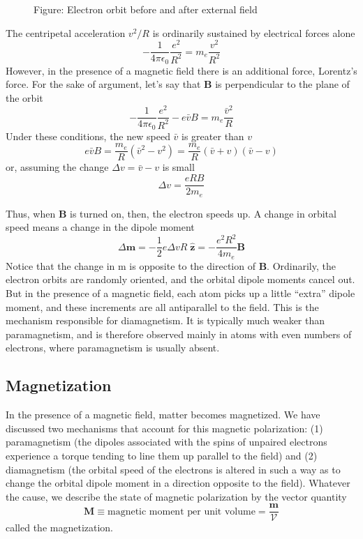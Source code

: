 \documentclass[../../../main.tex]{subfiles}
\begin{document}
\begin{figure}[b]
    \centering
    \caption*{Figure: Electron orbit before and after external field}
\end{figure}

The centripetal acceleration $v^2/R$ is ordinarily sustained by electrical forces alone
\begin{equation*}
    -\frac{1}{4\pi \epsilon_0}\frac{e^2}{R^2}=m_e\frac{v^2}{R^2}
\end{equation*}
However, in the presence of a magnetic ﬁeld there is an additional force, Lorentz's force. For the sake of argument, let's say that \textbf{B} is perpendicular to the plane of the orbit
\begin{equation*}
    -\frac{1}{4\pi \epsilon_0}\frac{e^2}{R^2}-e\bar{v}B=m_e\frac{\bar{v}^2}{R}
\end{equation*}
Under these conditions, the new speed $\bar{v}$ is greater than $v$
\begin{equation*}
    e\bar{v}B=\frac{m_e}{R}(\bar{v}^2-v^2)=\frac{m_e}{R}(\bar{v}+v)(\bar{v}-v)
\end{equation*}
or, assuming the change $\Delta v =\bar{v} - v$ is small
\begin{equation*}
    \Delta v =\frac{eRB}{2m_e}
\end{equation*}

Thus, when \textbf{B} is turned on, then, the electron speeds up. A change in orbital speed means a change in the dipole moment
\begin{equation*}
    \Delta\mathbf{m}=-\frac{1}{2}e\Delta v R \;\mathbf{\hat{z}}=-\frac{e^2R^2}{4m_e}\mathbf{B}
\end{equation*}
Notice that the change in m is opposite to the direction of \textbf{B}. Ordinarily, the electron orbits are randomly oriented, and the orbital dipole moments cancel out. But in the presence of a magnetic ﬁeld, each atom picks up a little “extra” dipole moment, and these increments are all antiparallel to the ﬁeld. This is the mechanism responsible for diamagnetism. It is typically much weaker than paramagnetism, and is therefore observed mainly in atoms with even numbers of electrons, where paramagnetism is usually absent.

\subsection{Magnetization}
In the presence of a magnetic ﬁeld, matter becomes magnetized. We have discussed two mechanisms that account for this magnetic polarization: (1) paramagnetism (the dipoles associated with the spins of unpaired electrons experience a torque tending to line them up parallel to the ﬁeld) and (2) diamagnetism (the orbital speed of the electrons is altered in such a way as to change the orbital dipole moment in a direction opposite to the ﬁeld). Whatever the cause, we describe the state of magnetic polarization by the vector quantity
\begin{equation*}
    \mathbf{M}\equiv\text{magnetic moment per unit volume}=\frac{\mathbf{m}}{\mathcal{V}}
\end{equation*}
called the magnetization. 
\end{document}
